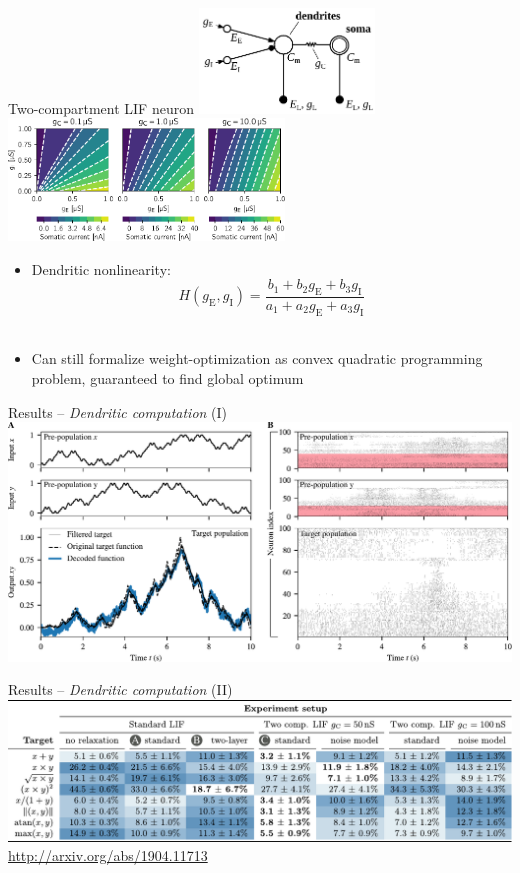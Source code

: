 \documentclass[aspectratio=169]{beamer}
\renewcommand{\emph}[1]{{\color{violet}\textit{#1}}}
\begin{document}
\begin{frame}{Two-compartment LIF neuron}
	{\centering
	\includegraphics[width=0.35\textwidth]{media/n_comp_lif_c.pdf}\hspace{0.75cm}
	\includegraphics[width=0.55\textwidth]{media/coupling_conductance_linearity_small.pdf}\\}

	\begin{itemize}
		\item Dendritic nonlinearity:
		$$H(g_\mathrm{E}, g_\mathrm{I}) = \frac{b_1 + b_2 g_\mathrm{E} + b_3 g_\mathrm{I}}{a_1 + a_2 g_\mathrm{E} + a_3 g_\mathrm{I}}$$\\[0.25cm]
		\item<2-> Can still formalize weight-optimization as convex quadratic programming problem, guaranteed to find global optimum
	\end{itemize}
\end{frame}

\begin{frame}{Results -- \emph{Dendritic computation} (I)}
	\includegraphics[width=\textwidth]{media/results_example.pdf}
\end{frame}

\begin{frame}{Results -- \emph{Dendritic computation} (II)}
	\centering
	\includegraphics[width=\textwidth]{media/result_table.pdf}\\[0.5cm]
	\url{http://arxiv.org/abs/1904.11713}
\end{frame}
\end{document}
